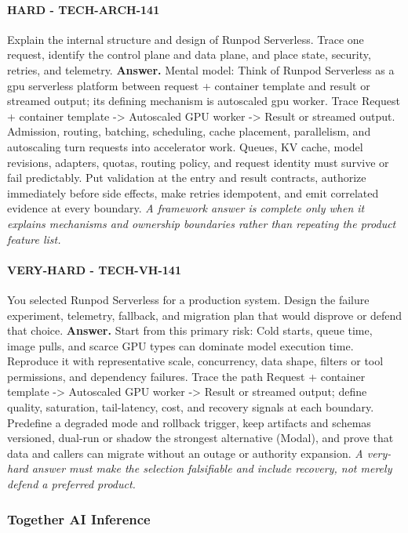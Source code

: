\paragraph{HARD - TECH-ARCH-141} Explain the internal structure and design of Runpod Serverless. Trace one request, identify the control plane and data plane, and place state, security, retries, and telemetry.
\textbf{Answer.} Mental model: Think of Runpod Serverless as a gpu serverless platform between request + container template and result or streamed output; its defining mechanism is autoscaled gpu worker. Trace Request + container template -> Autoscaled GPU worker -> Result or streamed output. Admission, routing, batching, scheduling, cache placement, parallelism, and autoscaling turn requests into accelerator work. Queues, KV cache, model revisions, adapters, quotas, routing policy, and request identity must survive or fail predictably. Put validation at the entry and result contracts, authorize immediately before side effects, make retries idempotent, and emit correlated evidence at every boundary.
\textit{A framework answer is complete only when it explains mechanisms and ownership boundaries rather than repeating the product feature list.}
\paragraph{VERY-HARD - TECH-VH-141} You selected Runpod Serverless for a production system. Design the failure experiment, telemetry, fallback, and migration plan that would disprove or defend that choice.
\textbf{Answer.} Start from this primary risk: Cold starts, queue time, image pulls, and scarce GPU types can dominate model execution time. Reproduce it with representative scale, concurrency, data shape, filters or tool permissions, and dependency failures. Trace the path Request + container template -> Autoscaled GPU worker -> Result or streamed output; define quality, saturation, tail-latency, cost, and recovery signals at each boundary. Predefine a degraded mode and rollback trigger, keep artifacts and schemas versioned, dual-run or shadow the strongest alternative (Modal), and prove that data and callers can migrate without an outage or authority expansion.
\textit{A very-hard answer must make the selection falsifiable and include recovery, not merely defend a preferred product.}
\subsubsection*{Together AI Inference}

